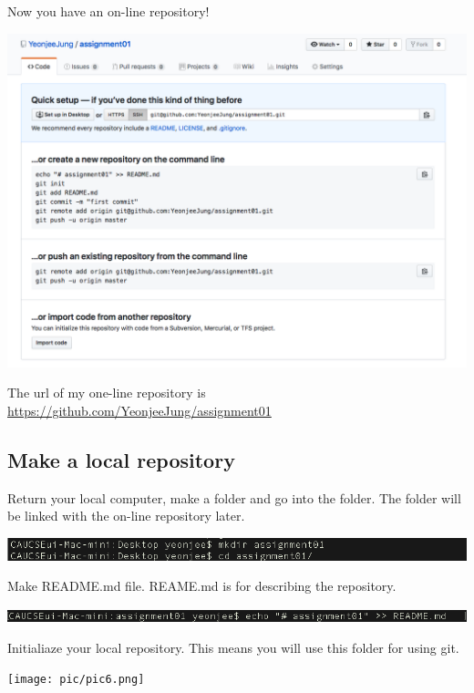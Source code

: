 \documentclass{article}
\begin{document}
\newpage
Now you have an on-line repository!
\begin{center}
    \includegraphics[scale = 0.4]{pic/pic3.png}
\end{center}

The url of my one-line repository is \href{https://github.com/YeonjeeJung/assignment01}{https://github.com/YeonjeeJung/assignment01}

\subsection{Make a local repository}

Return your local computer, make a folder and go into the folder. The folder will be linked with the on-line repository later.
\begin{center}
    \includegraphics[scale = 0.5]{pic/pic4.png}
\end{center}

Make README.md file. REAME.md is for describing the repository.
\begin{center}
    \includegraphics[scale = 0.5]{pic/pic5.png}
\end{center}

Initialiaze your local repository. This means you will use this folder for using git.
\begin{center}
    \texttt{[image: pic/pic6.png]}
\end{center}
\end{document}
